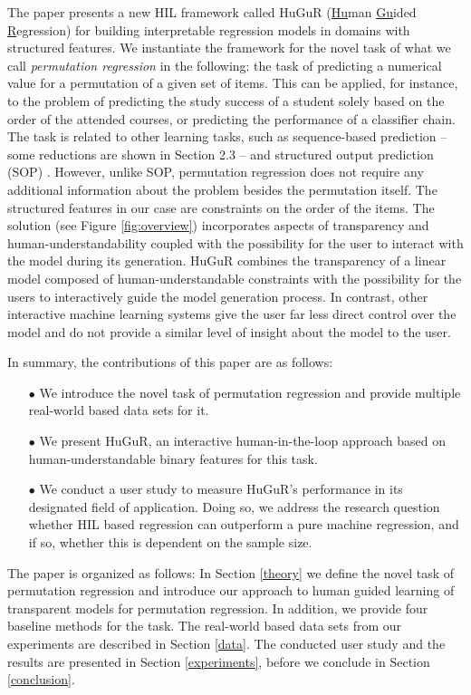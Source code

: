 The paper presents a new HIL framework called HuGuR (\underline{Hu}man \underline{Gu}ided \underline{R}egression) for building interpretable regression models in domains with structured features. We instantiate the framework for the novel task of what we call {\em permutation regression} in the following: the task of predicting a numerical value for a permutation of a given set of items. This can be applied, for instance, to the problem of predicting the study success of a student solely based on the order of the attended courses, or predicting the performance of a classifier chain\cite{classifierchains}. The task is related to other learning tasks, such as sequence-based prediction -- some reductions are shown in Section 2.3 -- and structured output prediction (SOP) \cite{SOP1}. However, unlike SOP, permutation regression does not require any additional information about the problem besides the permutation itself.
The structured features in our case are constraints on the order of the items. 
The solution (see Figure \ref{fig:overview}) incorporates aspects of transparency and human-understandability coupled with the possibility for the user to interact with the model during its generation. HuGuR combines the transparency of a linear model composed of human-understandable constraints with the possibility for the users to interactively guide the model generation process. In contrast, other interactive machine learning systems \cite{IA1} give the user far less direct control over the model and do not provide a similar level of insight about the model to the user.

In summary, the contributions of this paper are as follows:
\begin{itemize}
    \item[$\bullet$] We introduce the novel task of permutation regression and provide multiple real-world based data sets for it.
    \item[$\bullet$] We present HuGuR, an interactive human-in-the-loop approach based on human-understandable binary features for this task.
    \item[$\bullet$] We conduct a user study to measure HuGuR's performance in its designated field of application. Doing so, we address the research question whether HIL based regression can outperform a pure machine regression, and if so, whether this is dependent on the sample size.
\end{itemize}

The paper is organized as follows: In Section \ref{theory} we define the novel task of permutation regression and introduce our approach to human guided learning of transparent models for permutation regression. In addition, we provide four baseline methods for the task. The real-world based data sets from our experiments are described in Section \ref{data}. The conducted user study and the results are presented in Section \ref{experiments}, before we conclude in Section \ref{conclusion}.